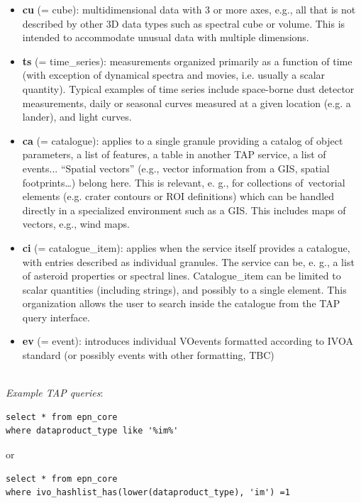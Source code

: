 \documentclass[11pt,a4paper]{ivoa}
\begin{document}
\begin{itemize}
\item \textbf{cu }(= cube): multidimensional data with 3 or more axes, e.g., all that is not described by other 3D data types such as spectral cube or volume. This is intended to accommodate unusual data with multiple dimensions.
\item \textbf{ts }(= time\_series): measurements organized primarily as a function of time (with exception of dynamical spectra and movies, i.e. usually a scalar quantity). Typical examples of time series include space-borne dust detector measurements, daily or seasonal curves measured at a given location (e.g. a lander), and light curves.
\item \textbf{ca }(= catalogue): applies to a single granule providing a catalog of object parameters, a list of features, a table in another TAP service, a list of events... ``Spatial vectors'' (e.g., vector information from a GIS, spatial footprints…) belong here. This is relevant, e. g., for collections of vectorial elements (e.g. crater contours or ROI definitions) which can be handled directly in a specialized environment such as a GIS. This includes maps of vectors, e.g., wind maps.
\item \textbf{ci }(= catalogue\_item): applies when the service itself provides a catalogue, with entries described as individual granules. The service can be, e. g., a list of asteroid properties or spectral lines. Catalogue\_item can be limited to scalar quantities (including strings), and possibly to a single element. This organization allows the user to search inside the catalogue from the TAP query interface.
\item \textbf{ev} (= event): introduces individual VOevents formatted according to IVOA standard (or possibly events with other formatting, TBC)
\end{itemize}

\\

\emph{Example TAP queries}:






\begin{verbatim}
select * from epn_core 
where dataproduct_type like '%im%'
\end{verbatim}




or 






\begin{verbatim}
select * from epn_core 
where ivo_hashlist_has(lower(dataproduct_type), 'im') =1
\end{verbatim}
\end{document}
